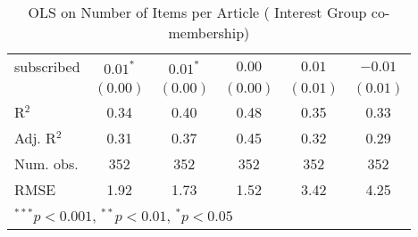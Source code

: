 \begin{table}[!h]
\begin{center}
\begin{tabular}{l c c c c c }
subscribed              & $0.01^{*}$   & $0.01^{*}$   & $0.00$       & $0.01$       & $-0.01$      \\
                        & $(0.00)$     & $(0.00)$     & $(0.00)$     & $(0.01)$     & $(0.01)$     \\
\midrule
R$^2$                   & 0.34         & 0.40         & 0.48         & 0.35         & 0.33         \\
Adj. R$^2$              & 0.31         & 0.37         & 0.45         & 0.32         & 0.29         \\
Num. obs.               & 352          & 352          & 352          & 352          & 352          \\
RMSE                    & 1.92         & 1.73         & 1.52         & 3.42         & 4.25         \\
\bottomrule
\multicolumn{6}{l}{\scriptsize{$^{***}p<0.001$, $^{**}p<0.01$, $^*p<0.05$}}
\end{tabular}
\caption{OLS on Number of Items per Article ( Interest Group co-membership)}
\label{table:coefficients}
\end{center}
\end{table}
